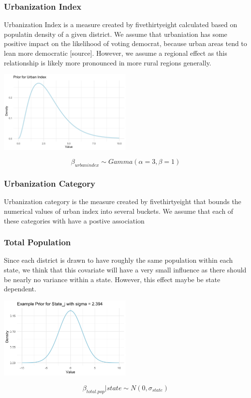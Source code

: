 \documentclass{beamer}
\begin{document}
\begin{frame}
\frametitle{Urbanization Index}
  Urbanization Index is a measure created by fivethirtyeight calculated based on populatin density of a given district.
  We assume that urbaniation has some positive impact on the likelihood of voting democrat, because urban areas tend to lean more democratic [source]. 
  However, we assume a regional effect as this relationship is likely more pronounced in more rural regions generally. %
  \begin{center}
    \includegraphics[width=0.5\textwidth]{plots/prior_urban.index.png}
  \end{center}
 
  
  $$ \beta_{urbanindex} \sim Gamma(\alpha = 3, \beta = 1 )$$ 
  \end{frame}

\begin{frame}
  \frametitle{Urbanization Category}
  Urbanization category is the measure created by fivethirtyeight that bounds the numerical values of urban index into several buckets. 
  We assume that each of these categories with have a postive association 

\end{frame}

\begin{frame}
  \frametitle{Total Population}
  Since each district is drawn to have roughly the same population within each state, we think that this covariate will have a very small influence as there should be nearly no variance within a state. However, this effect maybe be state dependent. 
  \begin{center}
    \includegraphics[width=0.5\textwidth]{plots/prior_total_pop.png}
  \end{center}
  
  $$ \beta_{total.pop} | state \sim  N(0, \sigma_{state})$$
\end{frame}
\end{document}
